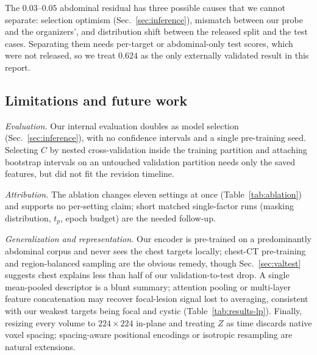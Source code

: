 \documentclass[runningheads]{llncs}
\begin{document}
The $0.03$--$0.05$ abdominal residual has three possible causes that we cannot
separate: selection optimism (Sec.~\ref{sec:inference}), mismatch between our
probe and the organizers', and distribution shift between the released split and
the test cases. Separating them needs per-target or abdominal-only test scores,
which were not released, so we treat $0.624$ as the only externally validated
result in this report.

\subsection{Limitations and future work}
\label{sec:limitations}
\emph{Evaluation.} Our internal evaluation doubles as model selection
(Sec.~\ref{sec:inference}), with no confidence intervals and a single
pre-training seed. Selecting $C$ by nested cross-validation inside the training
partition and attaching bootstrap intervals on an untouched validation partition
needs only the saved features, but did not fit the revision timeline.

\emph{Attribution.} The ablation changes eleven settings at once
(Table~\ref{tab:ablation}) and supports no per-setting claim; short matched
single-factor runs (masking distribution, $t_p$, epoch budget) are the needed
follow-up.

\emph{Generalization and representation.} Our encoder is pre-trained on a
predominantly abdominal corpus and never sees the chest targets locally;
chest-CT pre-training and region-balanced sampling are the obvious remedy, though
Sec.~\ref{sec:valtest} suggests chest explains less than half of our
validation-to-test drop. A single mean-pooled descriptor is a blunt summary;
attention pooling or multi-layer feature concatenation may recover focal-lesion
signal lost to averaging, consistent with our weakest targets being focal and
cystic (Table~\ref{tab:results-lp}). Finally, resizing every volume to
$224\times224$ in-plane and treating $Z$ as time discards native voxel spacing;
spacing-aware positional encodings or isotropic resampling are natural
extensions.

\end{document}
